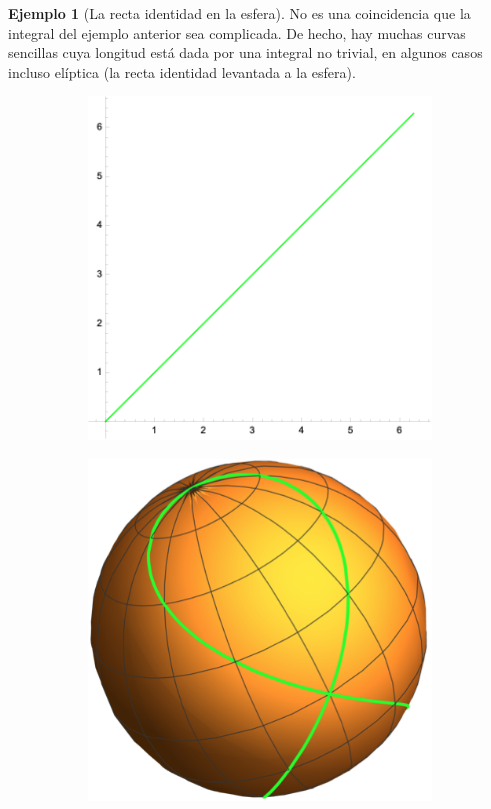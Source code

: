 \documentclass[spanish]{book}
\theoremstyle{definition}
\newtheorem*{ejem}{Ejemplo}
\begin{document}
\begin{ejem}[La recta identidad en la esfera]
	No es una coincidencia que la integral del ejemplo anterior sea complicada. De hecho, hay muchas curvas sencillas cuya longitud está dada por una integral no trivial, en algunos casos incluso elíptica (la recta identidad levantada a la esfera).	
	\begin{figure}[H]
		\begin{subfigure}{0.5\textwidth}
			\centering
			\includegraphics[width=0.7\linewidth]{sup5}
		\end{subfigure}
		\begin{subfigure}{0.5\textwidth}
			\centering
			\includegraphics[width=0.7\linewidth]{sup6}
		\end{subfigure}
	\end{figure}
\end{ejem}
\end{document}
